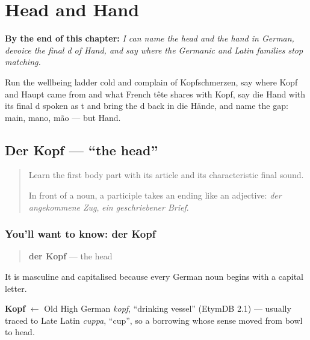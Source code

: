 
\chapter{Head and Hand}
\label{ch:ge-head-and-hand}

\begin{chapteropening}
\textbf{By the end of this chapter:} \emph{I can name the head and the hand in German, devoice the final d of Hand, and say where the Germanic and Latin families stop matching.}

Run the wellbeing ladder cold and complain of Kopfschmerzen, say where Kopf and Haupt came from and what French tête shares with Kopf, say die Hand with its final d spoken as t and bring the d back in die Hände, and name the gap: main, mano, mão — but Hand.
\end{chapteropening}

\section[der Kopf]{Der Kopf — “the head”}

\label{lesson:GE-C17-kopf}



\begin{quote}
Learn the first body part with its article and its characteristic final sound.

In front of a noun, a participle takes an ending like an adjective: \emph{der angekommene Zug}, \emph{ein geschriebener Brief}.
\end{quote}

\subsection*{You'll want to know: der Kopf}
\begin{quote}
\textbf{der Kopf} — the head
\end{quote}

It is masculine and capitalised because every German noun begins with a capital letter.

\begin{cousinweb}
\textbf{Kopf} $\leftarrow$ Old High German \emph{kopf}, \textquotedblleft{}drinking vessel\textquotedblright{} (EtymDB 2.1) — usually traced to Late Latin \emph{cuppa}, \textquotedblleft{}cup\textquotedblright{}, so a borrowing whose sense moved from bowl to head.
\end{cousinweb}

